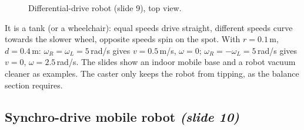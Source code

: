 \documentclass[11pt,a4paper]{article}
\newcommand{\fixedwheel}[2]{\begin{scope}[shift={(#1)},rotate=#2]
  \draw[fill=gray!30] (-0.3,-0.07) rectangle (0.3,0.07);\end{scope}}
\newcommand{\casterwheel}[2]{\begin{scope}[shift={(#1)},rotate=#2]
  \draw (0,0)--(-0.4,0); \draw[fill=white] (-0.6,-0.06) rectangle (-0.2,0.06);
  \fill (0,0) circle (1.5pt);\end{scope}}
\theoremstyle{definition}
\theoremstyle{plain}
\newtheorem{proposition}[definition]{Proposition}
\theoremstyle{remark}
\begin{document}
\begin{figure}[H]
\centering
{}
\caption{Differential-drive robot (slide 9), top view.}
\end{figure}


\begin{intuition}
It is a tank (or a wheelchair): equal speeds drive straight, different speeds curve towards the slower wheel, opposite speeds spin on the spot. With $r=0.1$\,m, $d=0.4$\,m: $\omega_R=\omega_L=5$\,rad/s gives $v=0.5$\,m/s, $\omega=0$; $\omega_R=-\omega_L=5$\,rad/s gives $v=0$, $\omega=2.5$\,rad/s. The slides show an indoor mobile base and a robot vacuum cleaner as examples. The caster only keeps the robot from tipping, as the balance section requires.
\end{intuition}

\subsection{Synchro-drive mobile robot \emph{(slide 10)}}
\end{document}
